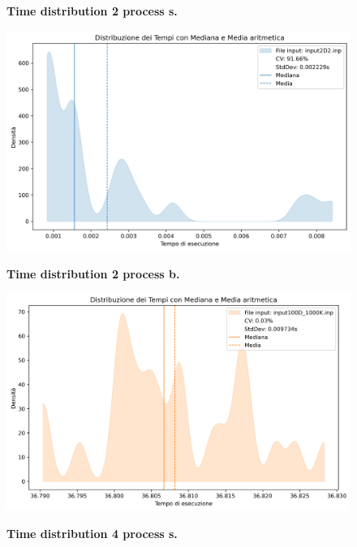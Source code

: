 \documentclass{article}
\begin{document}
  \begin{figure}[ht]
    \centering
    \begin{minipage}{0.45\textwidth}
      \centering
      \caption{\textbf{Time distribution 2 process s.}}
      \includegraphics[width=\linewidth]{../test_csv/plots/time_distribution/time_distribution_2D2_omp_mpi_2.png}
      \label{time_d_2_small}
    \end{minipage}
    \begin{minipage}{0.45\textwidth}
      \centering
      \caption{\textbf{Time distribution 2 process b.}}
      \includegraphics[width=\linewidth]{../test_csv/plots/time_distribution/time_distribution_100D_1000K_omp_mpi_2.png}
      \label{time_d_2_big}
    \end{minipage}
    \begin{minipage}{0.45\textwidth}
      \centering
      \caption{\textbf{Time distribution 4 process s.}}

\end{minipage}
\end{figure}
\end{document}
